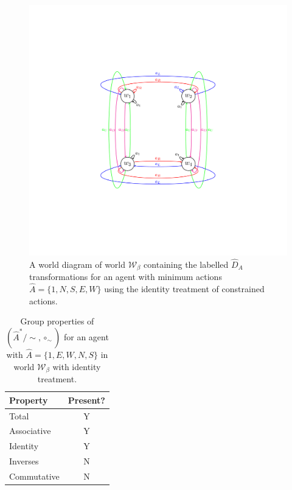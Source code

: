 \begin{figure}[H]
    \centering
    \includegraphics[width=0.75\linewidth]{5BeyondSBDRLGlobalAlgebras/Images/identity_walls_2x2_cyclical_min_actions.drawio.png}
    \caption{
        A world diagram of world $\mathscr{W}_{\beta}$ containing the labelled $\hat{D}_{A}$ transformations for an agent with minimum actions $\hat{A} = \{1, N, S, E, W\}$ using the identity treatment of constrained actions.
    }
    \label{fig:2x2_gridworld_minimum_transitions_wall_identity}
\end{figure}

\begin{table}[H]
\centering
\begin{tabular}{lc}
\hline
\textbf{Property} & \textbf{Present?} \\
\hline
Total & Y \\
Associative & Y \\
Identity & Y \\
Inverses & N \\
\hline
Commutative & N \\
\end{tabular}
\caption{
Group properties of $(\hat{A}^{*}/\sim, \circ_{\sim})$ for an agent with $\hat{A} = \{1, E, W, N, S \}$ in world $\mathscr{W}_{\beta}$ with identity treatment.
}
\end{table}


\begin{fullwidth}
\begin{landscape}
\setlength{\tabcolsep}{2pt}
{\fontsize{8}{10}\selectfont

}
\setlength{\tabcolsep}{6pt}
\end{landscape}
\end{fullwidth}



